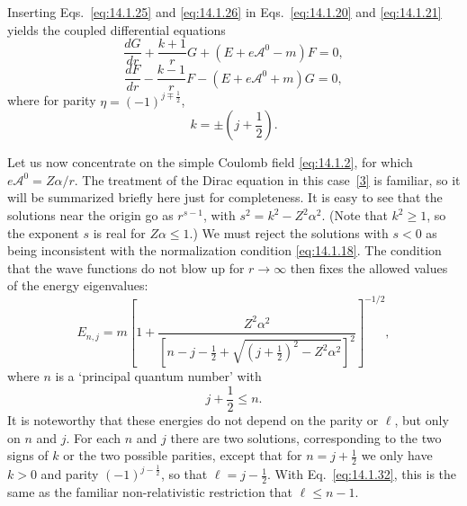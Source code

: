 Inserting Eqs.~\eqref{eq:14.1.25} and \eqref{eq:14.1.26} in
Eqs.~\eqref{eq:14.1.20} and \eqref{eq:14.1.21} yields the coupled differential
equations
\begin{equation}
  \frac{dG}{dr}+\frac{k+1}{r}G+(E+e\mathcal A^0-m)F=0,
  \tag{14.1.28}\label{eq:14.1.28}
\end{equation}
\begin{equation}
  \frac{dF}{dr}-\frac{k-1}{r}F-(E+e\mathcal A^0+m)G=0,
  \tag{14.1.29}\label{eq:14.1.29}
\end{equation}
where for parity $\eta=(-1)^{j\mp\frac12}$,
\begin{equation}
  k=\pm\left(j+\frac12\right).
  \tag{14.1.30}\label{eq:14.1.30}
\end{equation}

Let us now concentrate on the simple Coulomb field \eqref{eq:14.1.2}, for which
$e\mathcal A^0=Z\alpha/r$. The treatment of the Dirac equation in this
case~\hyperlink{ref:14.3}{[3]} is familiar, so it will be summarized briefly
here just for completeness. It is easy to see that the solutions near the
origin go as $r^{s-1}$, with $s^2=k^2-Z^2\alpha^2$. (Note that $k^2\geq1$, so
the exponent $s$ is real for $Z\alpha\leq1$.) We must reject the solutions with
$s<0$ as being inconsistent with the normalization condition
\eqref{eq:14.1.18}. The condition that the wave functions do not blow up for
$r\to\infty$ then fixes the allowed values of the energy eigenvalues:
\begin{equation}
 E_{n,j}=m\left[1+
 \frac{Z^2\alpha^2}{\left[n-j-\frac12+
 \sqrt{(j+\frac12)^2-Z^2\alpha^2}\right]^2}\right]^{-1/2},
 \tag{14.1.31}\label{eq:14.1.31}
\end{equation}
where $n$ is a `principal quantum number' with
\begin{equation}
  j+\frac12\leq n.
  \tag{14.1.32}\label{eq:14.1.32}
\end{equation}
It is noteworthy that these energies do not depend on the parity or $\ell$,
but only on $n$ and $j$. For each $n$ and $j$ there are two solutions,
corresponding to the two signs of $k$ or the two possible parities, except that
for $n=j+\frac12$ we only have $k>0$ and parity $(-1)^{j-\frac12}$, so that
$\ell=j-\frac12$. With Eq.~\eqref{eq:14.1.32}, this is the same as the familiar
non-relativistic restriction that $\ell\leq n-1$.


